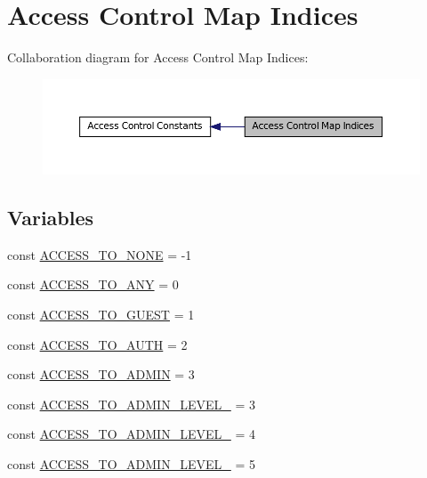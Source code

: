 \hypertarget{group__constants__acl__indices}{
\section{Access Control Map Indices}
\label{group__constants__acl__indices}
}


Collaboration diagram for Access Control Map Indices:\nopagebreak
\begin{figure}[H]
\begin{center}
\leavevmode
\includegraphics[width=400pt]{group__constants__acl__indices}
\end{center}
\end{figure}


\subsection*{Variables}
\begin{DoxyCompactItemize}
\item 
const \hyperlink{group__constants__acl__indices_ga63d56389fe1e58d0b097471ca4f4dc00}{ACCESS\_\-TO\_\-NONE} = -\/1
\item 
const \hyperlink{group__constants__acl__indices_ga8b17406db740d630ae61ecf3cd9bbd8c}{ACCESS\_\-TO\_\-ANY} = 0
\item 
const \hyperlink{group__constants__acl__indices_gaaef8a39bfe4d39dca0f45fdb837a8d59}{ACCESS\_\-TO\_\-GUEST} = 1
\item 
const \hyperlink{group__constants__acl__indices_ga437b41cb9e13e41157d57e7736366295}{ACCESS\_\-TO\_\-AUTH} = 2
\item 
const \hyperlink{group__constants__acl__indices_ga16a362e48c9f7e6757bb15e0a3d9fa4f}{ACCESS\_\-TO\_\-ADMIN} = 3
\item 
const \hyperlink{group__constants__acl__indices_ga6a8da045f81793625a0cb332106e71ba}{ACCESS\_\-TO\_\-ADMIN\_\-LEVEL\_} = 3
\item 
const \hyperlink{group__constants__acl__indices_ga3b271ad21d11058b550be5ab9599cce3}{ACCESS\_\-TO\_\-ADMIN\_\-LEVEL\_} = 4
\item 
const \hyperlink{group__constants__acl__indices_gaff610796a797e6a609363e5ab6028ca0}{ACCESS\_\-TO\_\-ADMIN\_\-LEVEL\_} = 5
\end{DoxyCompactItemize}


